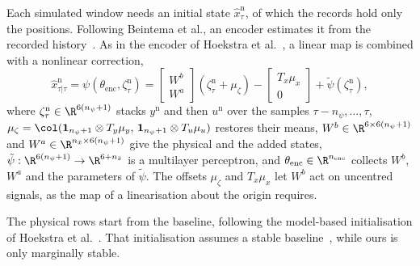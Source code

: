 Each simulated window needs an initial state $\hat x^{\mathrm n}_\tau$, of
which the records hold only the positions.
Following Beintema et al., an encoder estimates it from the recorded
history~\cite{beintema2023subnet}.
As in the encoder of Hoekstra et
al.~\cite[Eq.~(8)]{hoekstra2026encoder}, a linear map is combined with a
nonlinear correction,
\begin{equation}
 \hat x^{\mathrm n}_{\tau|\tau}
 =\psi(\theta_{\mathrm{enc}},\zeta^{\mathrm n}_\tau)
 =\begin{bmatrix}W^b\\ W^a\end{bmatrix}(\zeta^{\mathrm n}_\tau+\mu_\zeta)
 -\begin{bmatrix}T_x\mu_x\\ 0\end{bmatrix}
 +\tilde\psi(\zeta^{\mathrm n}_\tau),
 \label{eq:aug_encoder}
\end{equation}
where $\zeta^{\mathrm n}_\tau\in\R^{6(n_\psi+1)}$ stacks $y^{\mathrm n}$ and
then $u^{\mathrm n}$ over the samples $\tau-n_\psi,\dots,\tau$,
$\mu_\zeta=\col(\mathbf 1_{n_\psi+1}\otimes T_y\mu_y,\,
\mathbf 1_{n_\psi+1}\otimes T_u\mu_u)$ restores their means,
$W^b\in\R^{6\times6(n_\psi+1)}$ and $W^a\in\R^{n_{\bar x}\times6(n_\psi+1)}$
give the physical and the added states,
$\tilde\psi:\R^{6(n_\psi+1)}\to\R^{6+n_{\bar x}}$ is a multilayer perceptron,
and $\theta_{\mathrm{enc}}\in\R^{n_{\mathrm{enc}}}$ collects $W^b$, $W^a$ and
the parameters of $\tilde\psi$.
The offsets $\mu_\zeta$ and $T_x\mu_x$ let $W^b$ act on uncentred signals, as
the map of a linearisation about the origin requires.

The physical rows start from the baseline, following the model-based
initialisation of Hoekstra et al.~\cite[Sec.~3.1]{hoekstra2026encoder}.
That initialisation assumes a stable baseline~\cite[Sec.~2]{hoekstra2026encoder},
while ours is only marginally stable.


